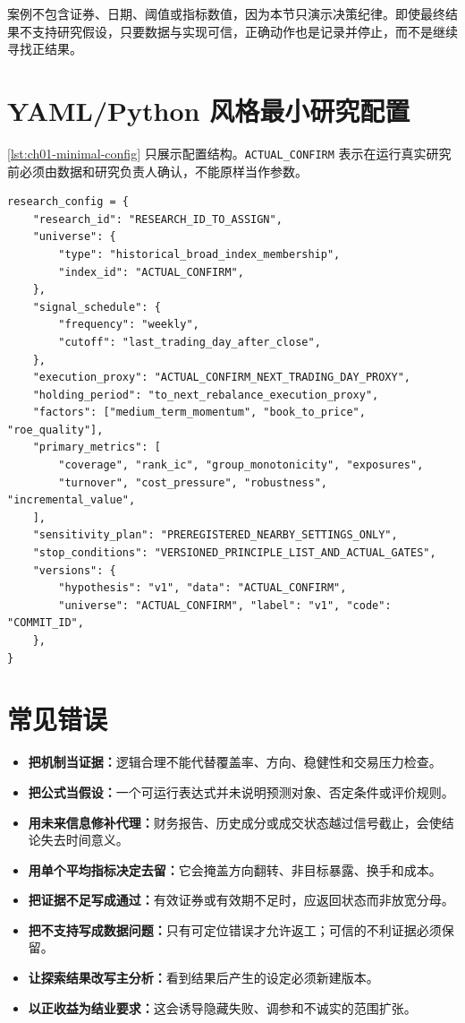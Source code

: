 案例不包含证券、日期、阈值或指标数值，因为本节只演示决策纪律。即使最终结果不支持研究假设，只要数据与实现可信，正确动作也是记录并停止，而不是继续寻找正结果。

\section{YAML/Python 风格最小研究配置}

\cref{lst:ch01-minimal-config} 只展示配置结构。\texttt{ACTUAL\_CONFIRM} 表示在运行真实研究前必须由数据和研究负责人确认，不能原样当作参数。

\begin{lstlisting}[caption={最小研究配置（结构示例，非真实项目参数）},label={lst:ch01-minimal-config}]
research_config = {
    "research_id": "RESEARCH_ID_TO_ASSIGN",
    "universe": {
        "type": "historical_broad_index_membership",
        "index_id": "ACTUAL_CONFIRM",
    },
    "signal_schedule": {
        "frequency": "weekly",
        "cutoff": "last_trading_day_after_close",
    },
    "execution_proxy": "ACTUAL_CONFIRM_NEXT_TRADING_DAY_PROXY",
    "holding_period": "to_next_rebalance_execution_proxy",
    "factors": ["medium_term_momentum", "book_to_price", "roe_quality"],
    "primary_metrics": [
        "coverage", "rank_ic", "group_monotonicity", "exposures",
        "turnover", "cost_pressure", "robustness", "incremental_value",
    ],
    "sensitivity_plan": "PREREGISTERED_NEARBY_SETTINGS_ONLY",
    "stop_conditions": "VERSIONED_PRINCIPLE_LIST_AND_ACTUAL_GATES",
    "versions": {
        "hypothesis": "v1", "data": "ACTUAL_CONFIRM",
        "universe": "ACTUAL_CONFIRM", "label": "v1", "code": "COMMIT_ID",
    },
}
\end{lstlisting}

\section{常见错误}

\begin{itemize}
  \item \textbf{把机制当证据：}逻辑合理不能代替覆盖率、方向、稳健性和交易压力检查。
  \item \textbf{把公式当假设：}一个可运行表达式并未说明预测对象、否定条件或评价规则。
  \item \textbf{用未来信息修补代理：}财务报告、历史成分或成交状态越过信号截止，会使结论失去时间意义。
  \item \textbf{用单个平均指标决定去留：}它会掩盖方向翻转、非目标暴露、换手和成本。
  \item \textbf{把证据不足写成通过：}有效证券或有效期不足时，应返回状态而非放宽分母。
  \item \textbf{把不支持写成数据问题：}只有可定位错误才允许返工；可信的不利证据必须保留。
  \item \textbf{让探索结果改写主分析：}看到结果后产生的设定必须新建版本。
  \item \textbf{以正收益为结业要求：}这会诱导隐藏失败、调参和不诚实的范围扩张。
\end{itemize}

